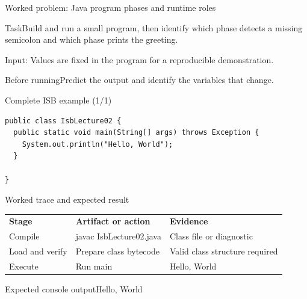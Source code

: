 \documentclass[10pt,aspectratio=169]{beamer}
\begin{document}
\begin{frame}[fragile,t]{Worked problem: Java program phases and runtime roles}
\begin{block}{Task}Build and run a small program, then identify which phase detects a missing semicolon and which phase prints the greeting.\end{block}
\small Input: Values are fixed in the program for a reproducible demonstration.\par\vspace{3mm}\begin{exampleblock}{Before running}Predict the output and identify the variables that change.\end{exampleblock}
\end{frame}

\begin{frame}[fragile,t]{Complete ISB example (1/1)}
\begin{lstlisting}
public class IsbLecture02 {
  public static void main(String[] args) throws Exception {
    System.out.println("Hello, World");
  }

}
\end{lstlisting}
\end{frame}

\begin{frame}[fragile,t]{Worked trace and expected result}
\small\renewcommand{\arraystretch}{1.4}
\begin{tabularx}{\textwidth}{>{\raggedright\arraybackslash}X>{\raggedright\arraybackslash}X>{\raggedright\arraybackslash}X}\rowcolor{navy}
\color{white}\bfseries Stage & \color{white}\bfseries Artifact or action & \color{white}\bfseries Evidence\\
Compile & javac IsbLecture02.java & Class file or diagnostic\\
Load and verify & Prepare class bytecode & Valid class structure required\\
Execute & Run main & Hello, World\\
\end{tabularx}\par\vspace{2mm}
\begin{block}{Expected console output}\ttfamily\footnotesize Hello, World\end{block}
\end{frame}
\end{document}
